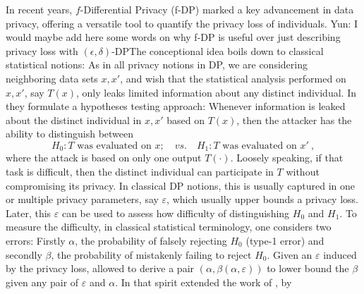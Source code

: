In recent years, $f$-Differential Privacy (f-DP) marked a key advancement in data privacy, offering a versatile tool to quantify the privacy loss of individuals. {\color{red} Yun: I would maybe add here some words on why f-DP is useful over just describing privacy loss with $(\epsilon,\delta)$-DP}The conceptional idea boils down to classical statistical notions: As in all privacy notions in DP, we are considering neighboring data sets $x,x'$, and wish that the statistical analysis performed on $x,x'$, say $T(x)$, only leaks limited information about any distinct individual. In  they formulate a hypotheses testing approach: Whenever information is leaked about the distinct individual in $x, x'$ based on $T(x)$, then the attacker has the ability to distinguish between
\begin{equation*}
    H_0: T \text{ was evaluated on } x; \quad vs. \quad H_1: T \text{ was evaluated on } x'~,
\end{equation*}
where the attack is based on only one output $T(\cdot)$. Loosely speaking, if that task is difficult, then the distinct individual can participate in $T$ without compromising its privacy.  In classical DP notions, this is usually captured in one or multiple privacy parameters, say $\varepsilon$, which usually upper bounds a privacy loss. Later, this $\varepsilon$ can be used to assess how difficulty of distinguishing $H_0$ and $H_1$. To measure the difficulty, in classical statistical terminology, one considers two errors: Firstly $\alpha$, the probability of falsely rejecting $H_0$  (type-1 error) and secondly $\beta$, the probability of mistakenly failing to reject $H_0$. Given an $\varepsilon$ induced by the privacy loss,  allowed to derive a pair $(\alpha,\beta(\alpha, \varepsilon))$ to lower bound the $\beta$ given any pair of $\varepsilon$ and $\alpha$. In that spirit  extended the work of , by 


